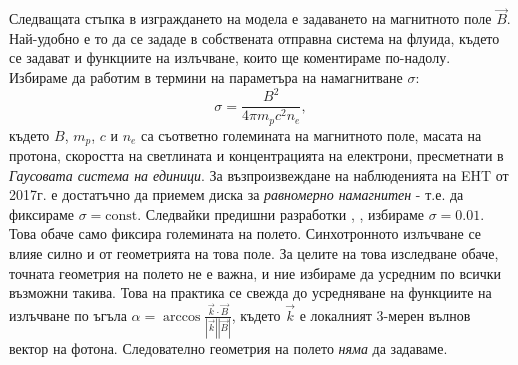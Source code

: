 \documentclass[12pt]{article}
\numberwithin{equation}{section}
\numberwithin{figure}{section}
\begin{document}
	Следващата стъпка в изграждането на модела е задаването на магнитното поле $\vec{B}$. Най-удобно е то да се зададе в собствената отправна система на флуида, където се задават и функциите на излъчване, които ще коментираме по-надолу. Избираме да работим в термини на параметъра на намагнитване $\sigma$:
	\begin{equation}
		\sigma = \frac{B^2}{4\pi m_pc^2n_e},
	\end{equation}
	където $B$, $m_p$, $c$ и $n_e$ са съответно големината на магнитното поле, масата на протона, скоростта на светлината и концентрацията на електрони, пресметнати в \emph{Гаусовата система на единици}. За възпроизвеждане на наблюденията на EHT от 2017г. е достатъчно да приемем диска за \emph{равномерно намагнитен} - т.е. да фиксираме $\sigma = \text{const}$. Следвайки предишни разработки \cite{KERR_SIM_PAPER}, \cite{Geometric_Modeling}, избираме $\sigma = 0.01$. Това обаче само фиксира големината на полето. Синхотронното излъчване се влияе силно и от геометрията на това поле. За целите на това изследване обаче, точната геометрия на полето не е важна, и ние избираме да усредним по всички възможни такива. Това на практика се свежда до усредняване на функциите на излъчване по ъгъла $\alpha = \arccos\frac{\vec{k}\cdot\vec{B}}{|\vec{k}||\vec{B}|}$, където $\vec{k}$ е локалният 3-мерен вълнов вектор на фотона. Следователно геометрия на полето \emph{няма} да задаваме.\\
	
\end{document}
